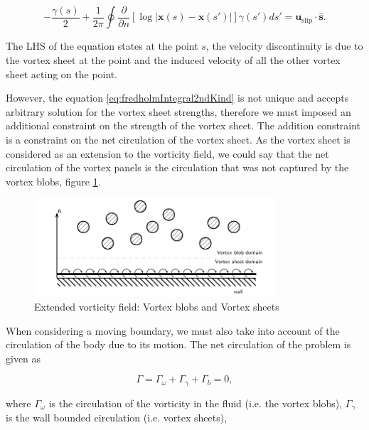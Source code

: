 	\begin{equation}
	-\frac{\gamma\left(s\right)}{2} + \frac{1}{2\pi}\oint\frac{\partial}{\partial n}\left[\log\left|\mathbf{x}\left(s\right)-\mathbf{x}\left(s'\right)\right|\right]\gamma\left(s'\right)ds'= \mathbf{u}_{\mathrm{slip}}\cdot\mathbf{\hat{s}}.
	\label{eq:fredholmIntegral2ndKind}
	\end{equation}
		
The LHS of the equation states at the point $s$, the velocity discontinuity is due to the vortex sheet at the point and the induced velocity of all the other vortex sheet acting on the point. 

However, the equation \ref{eq:fredholmIntegral2ndKind} is not unique and accepts arbitrary solution for the vortex sheet strengths, therefore we must imposed an additional constraint on the strength of the vortex sheet. The addition constraint is a constraint on the net circulation of the vortex sheet. As the vortex sheet is considered as an extension to the vorticity field, we could say that the net circulation of the vortex panels	is the circulation that was not captured by the vortex blobs, figure \ref{fig:extendedVorticityField}.
	
	\begin{figure}[t]
	\centering
	\includegraphics[width=0.8\textwidth]{figures/lagrangian/extendedVorticityField.pdf}
	\caption{Extended vorticity field: Vortex blobs and Vortex sheets}
	\label{fig:extendedVorticityField}
	\end{figure}	
	
When considering a moving boundary, we must also take into account of the circulation of the body due to its motion. The net circulation of the problem is given as

	\begin{equation}
	\Gamma = \Gamma_{\omega} + \Gamma_{\gamma} + \Gamma_{b} = 0,
	\end{equation}	

where $\Gamma_{\omega}$ is the circulation of the vorticity in the fluid (i.e. the vortex blobs), $\Gamma_{\gamma}$ is the wall bounded circulation (i.e. vortex sheets),

